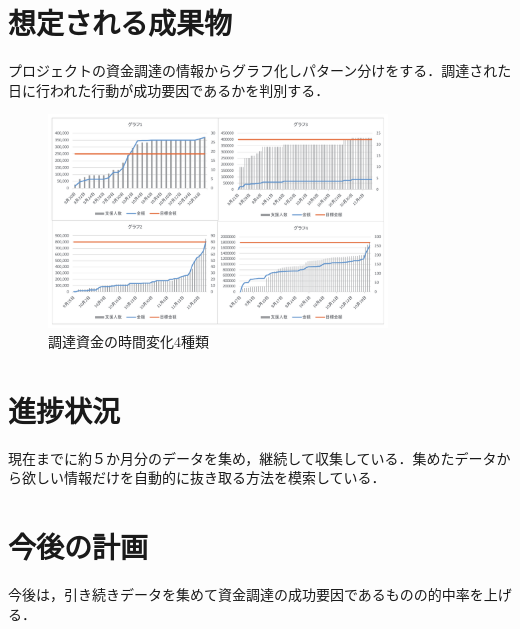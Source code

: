\documentclass[uplatex,twocolumn,dvipdfmx]{jsarticle}
\begin{document}
\section{想定される成果物}
プロジェクトの資金調達の情報からグラフ化しパターン分けをする．調達された日に行われた行動が成功要因であるかを判別する．

\begin{figure}[h]
\centering
\includegraphics[width=9cm,clip]{images.pdf}
\caption{調達資金の時間変化4種類}\label{サンプル図}
\end{figure}
\section{進捗状況}
現在までに約５か月分のデータを集め，継続して収集している．集めたデータから欲しい情報だけを自動的に抜き取る方法を模索している．
\section{今後の計画}
今後は，引き続きデータを集めて資金調達の成功要因であるものの的中率を上げる．



\end{document}
